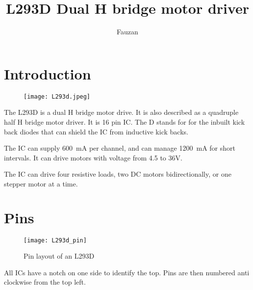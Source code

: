 \documentclass{article}
\title{L293D Dual H bridge motor driver}
\author{Fauzan}
\begin{document}
\newcommand{\inlncd}[1]{\colorbox{lgray}{\texttt{#1}}}
\newcommand{\icpin}[2]{\setlength{\fboxsep}{0pt} \fbox{\texttt{\colorbox{lgray}{\strut{}\,PIN~#1\,}\,#2\,}} \setlength{\fboxsep}{2pt}}


\maketitle



\section{Introduction}

	\begin{figure}[h]
		\centering
		\texttt{[image: L293d.jpeg]}
	\end{figure}

	The L293D is a dual H bridge motor drive. It is also described as a quadruple half H bridge motor driver. It is 16 pin IC. The D stands for for the inbuilt kick back diodes that can shield the IC from inductive kick backs.

	The IC can supply 600~mA per channel, and can manage 1200~mA for short intervals. It can drive motors with voltage from 4.5 to 36V.

	The IC can drive four resistive loads, two DC motors bidirectionally, or one stepper motor at a time.

\newpage

\section{Pins}

	\begin{figure}[h]
		\centering
		\texttt{[image: L293d\_pin]}
		\caption{Pin layout of an L293D}
	\end{figure}

	All ICs have a notch on one side to identify the top. Pins are then numbered anti clockwise from the top left.
\end{document}
